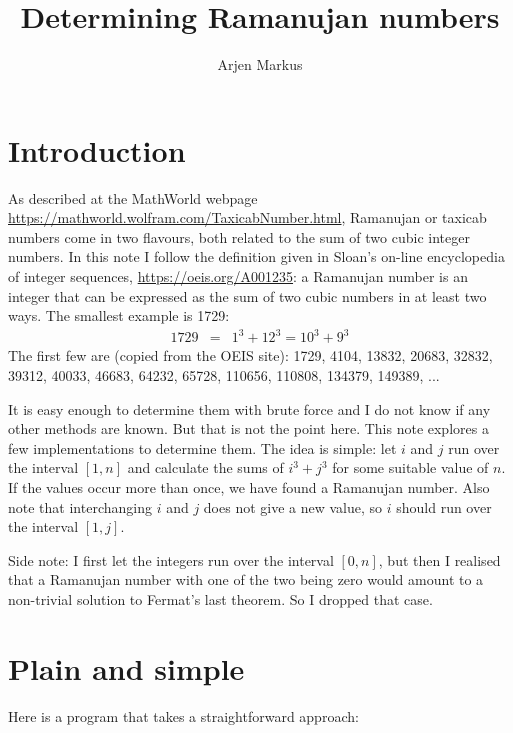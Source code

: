 \documentclass[onecolumn]{article}
\begin{document}
\title{Determining Ramanujan numbers}

\author{Arjen Markus}

\maketitle

\section*{Introduction}
As described at the MathWorld webpage \url{https://mathworld.wolfram.com/TaxicabNumber.html}, Ramanujan or taxicab numbers come in two
flavours, both related to the sum of two cubic integer numbers. In this note I follow the definition given in Sloan's on-line encyclopedia of
integer sequences, \url{https://oeis.org/A001235}: a Ramanujan number is an integer that can be expressed as the sum of two cubic numbers
in at least two ways. The smallest example is 1729:
\begin{eqnarray}
    1729 &=& 1^3 + 12^3 = 10^3 + 9^3
\end{eqnarray}
The first few are (copied from the OEIS site): 1729, 4104, 13832, 20683, 32832, 39312, 40033, 46683, 64232, 65728, 110656, 110808, 134379, 149389, ...

It is easy enough to determine them with brute force and I do not know if any other methods are known. But that is not the point here.
This note explores a few implementations to determine them. The idea is simple: let $i$ and $j$ run over the interval $[1,n]$ and calculate
the sums of $i^3+j^3$ for some suitable value of $n$. If the values occur more than once, we have found a Ramanujan number. Also note that
interchanging $i$ and $j$ does not give a new value, so $i$ should run over the interval $[1,j]$.

Side note: I first let the integers run over the interval $[0,n]$, but then I realised that a Ramanujan number with one of the two being zero would
amount to a non-trivial solution to Fermat's last theorem. So I dropped that case.

\section*{Plain and simple}
Here is a program that takes a straightforward approach:
\end{document}
